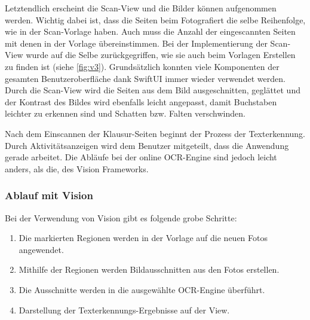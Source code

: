 \documentclass[notables, nomenclature, oneside, 150]{HSMW-Thesis}
\begin{document}
			Letztendlich erscheint die Scan-View und die Bilder können aufgenommen werden. Wichtig dabei ist, dass die Seiten beim Fotografiert die selbe Reihenfolge, wie in der Scan-Vorlage haben. Auch muss die Anzahl der eingescannten Seiten mit denen in der Vorlage übereinstimmen. Bei der Implementierung der Scan-View wurde auf die Selbe zurückgegriffen, wie sie auch beim Vorlagen Erstellen zu finden ist (siehe \ref{fig:v3}). Grundsätzlich konnten viele Komponenten der gesamten Benutzeroberfläche dank SwiftUI immer wieder verwendet werden. Durch die Scan-View wird die Seiten aus dem Bild ausgeschnitten, geglättet und der Kontrast des Bildes wird ebenfalls leicht angepasst, damit Buchstaben leichter zu erkennen sind und Schatten bzw. Falten verschwinden.
			
			Nach dem Einscannen der Klausur-Seiten beginnt der Prozess der Texterkennung. Durch Aktivitätsanzeigen wird dem Benutzer mitgeteilt, dass die Anwendung gerade arbeitet. Die Abläufe bei der online OCR-Engine sind jedoch leicht anders, als die, des Vision Frameworks.
			
			\subsubsection*{Ablauf mit Vision}
				Bei der Verwendung von Vision gibt es folgende grobe Schritte:
				\vspace{-5mm}
				\begin{enumerate}
					\item Die markierten Regionen werden in der Vorlage auf die neuen Fotos angewendet.
					\item Mithilfe der Regionen werden Bildausschnitten aus den Fotos erstellen.
					\item Die Ausschnitte werden in die ausgewählte OCR-Engine überführt.
					\item Darstellung der Texterkennungs-Ergebnisse auf der View.
				\end{enumerate}
			
\end{document}
